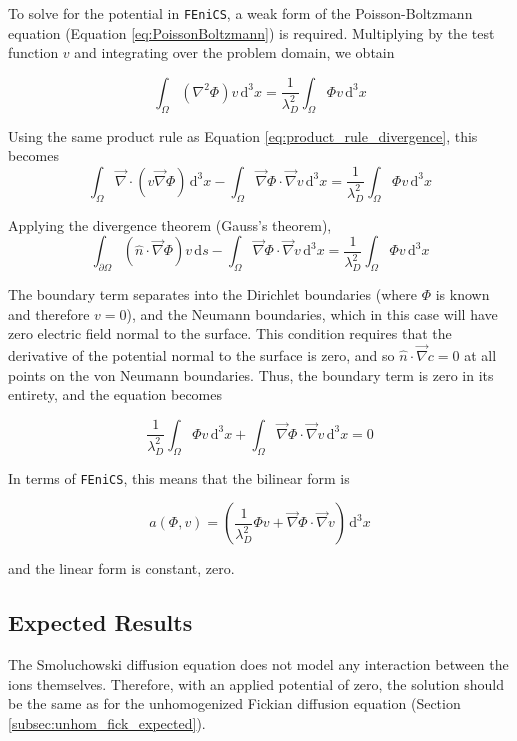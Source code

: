 To solve for the potential in \texttt{FEniCS},
a weak form of the Poisson-Boltzmann equation (Equation \ref{eq:PoissonBoltzmann}) is required.
Multiplying by the test function $v$ and integrating over the problem domain, we obtain

\begin{equation}
\int_{\Omega} \left(\nabla^2 \Phi \right) v \,\mathrm{d}^3x = \frac{1}{\lambda_D^2} \int_{\Omega} \Phi v \,\mathrm{d}^3x
\end{equation}

Using the same product rule as Equation \ref{eq:product_rule_divergence}, this becomes
\begin{equation}
\int_{\Omega} \vec{\nabla} \cdot \left( v \vec{\nabla} \Phi \right) \,\mathrm{d}^3x
- \int_{\Omega} \vec{\nabla}\Phi \cdot \vec{\nabla}v \,\mathrm{d}^3x
= \frac{1}{\lambda_D^2} \int_{\Omega} \Phi v \,\mathrm{d}^3x
\end{equation}

Applying the divergence theorem (Gauss's theorem),
\begin{equation}
\int_{\partial\Omega} \left( \hat{n} \cdot \vec{\nabla} \Phi \right) v \,\mathrm{d}s
- \int_{\Omega} \vec{\nabla}\Phi \cdot \vec{\nabla}v \,\mathrm{d}^3x
= \frac{1}{\lambda_D^2} \int_{\Omega} \Phi v \,\mathrm{d}^3x
\end{equation}

The boundary term separates into the Dirichlet boundaries (where $\Phi$ is known and therefore $v=0$),
and the Neumann boundaries, which in this case will have zero electric field normal to the surface.
This condition requires that the derivative of the potential normal to the surface is zero,
and so $\hat{n} \cdot \vec{\nabla} c = 0$ at all points on the von Neumann boundaries.
Thus, the boundary term is zero in its entirety, and the equation becomes

\begin{equation}
\frac{1}{\lambda_D^2} \int_{\Omega} \Phi v \,\mathrm{d}^3x
+ \int_{\Omega} \vec{\nabla}\Phi \cdot \vec{\nabla}v \,\mathrm{d}^3x
= 0
\end{equation}

In terms of \texttt{FEniCS}, this means that the bilinear form is

\begin{equation}
a(\Phi,v)=\left(\frac{1}{\lambda_D^2} \Phi v  + \vec{\nabla}\Phi \cdot \vec{\nabla}v \right) \,\mathrm{d}^3x
\end{equation}

and the linear form is constant, zero.

\subsection{Expected Results}\label{subsec:unhom_smol_expected}

The Smoluchowski diffusion equation does not model any interaction between the ions themselves.
Therefore, with an applied potential of zero,
the solution should be the same as for the
unhomogenized Fickian diffusion equation (Section \ref{subsec:unhom_fick_expected}).

